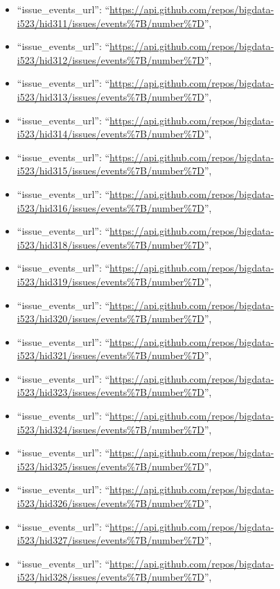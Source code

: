 \begin{itemize}
\item
  ``issue\_events\_url'':
  ``\url{https://api.github.com/repos/bigdata-i523/hid311/issues/events\%7B/number\%7D}'',
\item
  ``issue\_events\_url'':
  ``\url{https://api.github.com/repos/bigdata-i523/hid312/issues/events\%7B/number\%7D}'',
\item
  ``issue\_events\_url'':
  ``\url{https://api.github.com/repos/bigdata-i523/hid313/issues/events\%7B/number\%7D}'',
\item
  ``issue\_events\_url'':
  ``\url{https://api.github.com/repos/bigdata-i523/hid314/issues/events\%7B/number\%7D}'',
\item
  ``issue\_events\_url'':
  ``\url{https://api.github.com/repos/bigdata-i523/hid315/issues/events\%7B/number\%7D}'',
\item
  ``issue\_events\_url'':
  ``\url{https://api.github.com/repos/bigdata-i523/hid316/issues/events\%7B/number\%7D}'',
\item
  ``issue\_events\_url'':
  ``\url{https://api.github.com/repos/bigdata-i523/hid318/issues/events\%7B/number\%7D}'',
\item
  ``issue\_events\_url'':
  ``\url{https://api.github.com/repos/bigdata-i523/hid319/issues/events\%7B/number\%7D}'',
\item
  ``issue\_events\_url'':
  ``\url{https://api.github.com/repos/bigdata-i523/hid320/issues/events\%7B/number\%7D}'',
\item
  ``issue\_events\_url'':
  ``\url{https://api.github.com/repos/bigdata-i523/hid321/issues/events\%7B/number\%7D}'',
\item
  ``issue\_events\_url'':
  ``\url{https://api.github.com/repos/bigdata-i523/hid323/issues/events\%7B/number\%7D}'',
\item
  ``issue\_events\_url'':
  ``\url{https://api.github.com/repos/bigdata-i523/hid324/issues/events\%7B/number\%7D}'',
\item
  ``issue\_events\_url'':
  ``\url{https://api.github.com/repos/bigdata-i523/hid325/issues/events\%7B/number\%7D}'',
\item
  ``issue\_events\_url'':
  ``\url{https://api.github.com/repos/bigdata-i523/hid326/issues/events\%7B/number\%7D}'',
\item
  ``issue\_events\_url'':
  ``\url{https://api.github.com/repos/bigdata-i523/hid327/issues/events\%7B/number\%7D}'',
\item
  ``issue\_events\_url'':
  ``\url{https://api.github.com/repos/bigdata-i523/hid328/issues/events\%7B/number\%7D}'',

\end{itemize}
